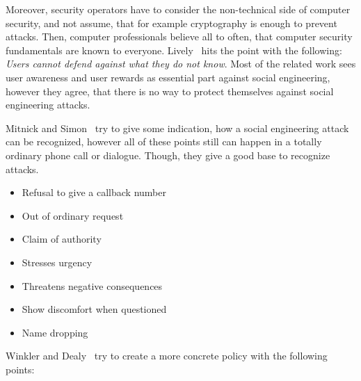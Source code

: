 Moreover, security operators have to consider the non-technical side of
computer security, and not assume, that for example cryptography is enough to
prevent attacks. Then, computer professionals believe all to often, that
computer security fundamentals are known to everyone. Lively~\cite{lively2003} hits
the point with the following: \textit{\glqq{}Users cannot defend against what
they do not know\grqq{}}. Most of the related work sees user awareness and user
rewards as essential part against social engineering, however they agree, that
there is no way to protect themselves against social engineering attacks.

Mitnick and Simon~\cite{mitnick2003} try to give some indication, how a social
engineering attack can be recognized, however all of these points still can
happen in a totally ordinary phone call or dialogue. Though, they give a good
base to recognize attacks.

\begin{itemize}
  \item Refusal to give a callback number
  \item Out of ordinary request
  \item Claim of authority
  \item Stresses urgency
  \item Threatens negative consequences
  \item Show discomfort when questioned
  \item Name dropping
\end{itemize}

Winkler and Dealy~\cite{winkler1995} try to create a more concrete policy with
the following points:


